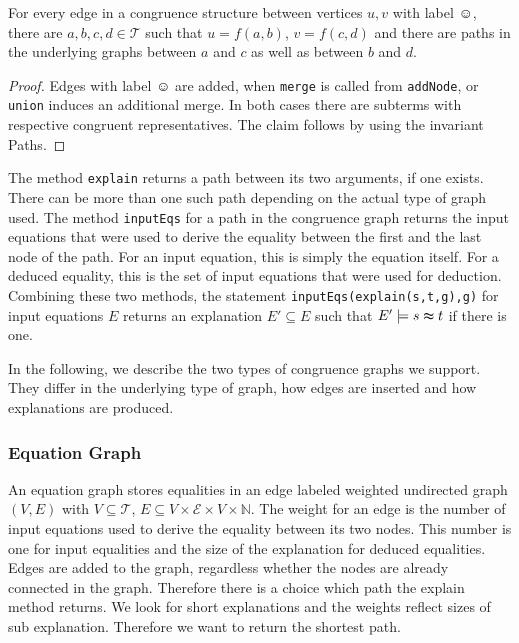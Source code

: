 \begin{invariant}

For every edge in a congruence structure between vertices $u,v$ with label $\smiley$, 
there are $a,b,c,d \in \mathcal{T}$ such that $u = f(a,b)$, $v = f(c,d)$ and
there are paths in the underlying graphs between $a$ and $c$ as well as between $b$ and $d$.

\end{invariant}

\begin{proof}

Edges with label $\smiley$ are added, when \texttt{merge} is called from \texttt{addNode}, or \texttt{union} induces an additional merge.
In both cases there are subterms with respective congruent representatives.
The claim follows by using the invariant Paths.

\end{proof}

The method \texttt{explain} returns a path between its two arguments, if one exists.
There can be more than one such path depending on the actual type of graph used.
The method \texttt{inputEqs} for a path in the congruence graph returns the input equations that were used to derive the equality between the first and the last node of the path.
For an input equation, this is simply the equation itself.
For a deduced equality, this is the set of input equations that were used for deduction.
Combining these two methods, the statement \texttt{inputEqs(explain(s,t,g),g)} for input equations $E$ returns an explanation $E' \subseteq E$ such that $E' \models s \thickapprox t$ if there is one.



In the following, we describe the two types of congruence graphs we support.
They differ in the underlying type of graph, how edges are inserted and how explanations are produced.

\subsubsection*{Equation Graph}

An equation graph stores equalities in an edge labeled weighted undirected graph $(V,E)$ with 
$V \subseteq \mathcal{T}$, $E \subseteq V \times \mathcal{E} \times V \times \mathbb{N}$.
The weight for an edge is the number of input equations used to derive the equality between its two nodes.
This number is one for input equalities and the size of the explanation for deduced equalities.
Edges are added to the graph, regardless whether the nodes are already connected in the graph.
Therefore there is a choice which path the explain method returns.
We look for short explanations and the weights reflect sizes of sub explanation.
Therefore we want to return the shortest path.

